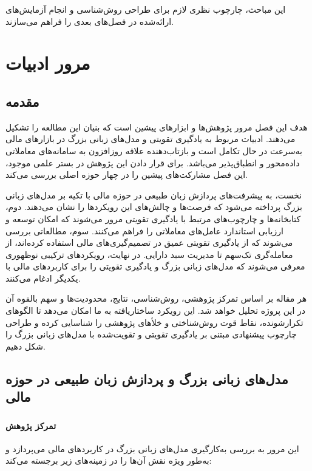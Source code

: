 \documentclass[12pt, a4paper]{report}
\begin{document}
این مباحث، چارچوب نظری لازم برای طراحی روش‌شناسی و انجام آزمایش‌های ارائه‌شده در فصل‌های بعدی را فراهم می‌سازند.


\chapter{مرور ادبیات}

\section{مقدمه}

هدف این فصل مرور پژوهش‌ها و ابزارهای پیشین است که بنیان این مطالعه را تشکیل می‌دهند. ادبیات مربوط به یادگیری تقویتی و مدل‌های زبانی بزرگ در بازارهای مالی به‌سرعت در حال تکامل است و بازتاب‌دهنده علاقه روزافزون به سامانه‌های معاملاتی داده‌محور و انطباق‌پذیر می‌باشد. برای قرار دادن این پژوهش در بستر علمی موجود، این فصل مشارکت‌های پیشین را در چهار حوزه اصلی بررسی می‌کند.  

نخست، به پیشرفت‌های پردازش زبان طبیعی در حوزه مالی با تکیه بر مدل‌های زبانی بزرگ پرداخته می‌شود که فرصت‌ها و چالش‌های این رویکردها را نشان می‌دهند. دوم، کتابخانه‌ها و چارچوب‌های مرتبط با یادگیری تقویتی مرور می‌شوند که امکان توسعه و ارزیابی استاندارد عامل‌های معاملاتی را فراهم می‌کنند. سوم، مطالعاتی بررسی می‌شوند که از یادگیری تقویتی عمیق در تصمیم‌گیری‌های مالی استفاده کرده‌اند، از معامله‌گری تک‌سهم تا مدیریت سبد دارایی. در نهایت، رویکردهای ترکیبی نوظهوری معرفی می‌شوند که مدل‌های زبانی بزرگ و یادگیری تقویتی را برای کاربردهای مالی با یکدیگر ادغام می‌کنند.

هر مقاله بر اساس تمرکز پژوهشی، روش‌شناسی، نتایج، محدودیت‌ها و سهم بالقوه آن در این پروژه تحلیل خواهد شد. این رویکرد ساختاریافته به ما امکان می‌دهد تا الگوهای تکرارشونده، نقاط قوت روش‌شناختی و خلأهای پژوهشی را شناسایی کرده و طراحی چارچوب پیشنهادی مبتنی بر یادگیری تقویتی و تقویت‌شده با مدل‌های زبانی بزرگ را شکل دهیم.  


\section{مدل‌های زبانی بزرگ و پردازش زبان طبیعی در حوزه مالی}

\subsection{ \cite{nie2024survey}}

\subsubsection{تمرکز پژوهش}
این مرور به بررسی به‌کارگیری مدل‌های زبانی بزرگ در کاربردهای مالی می‌پردازد و به‌طور ویژه نقش آن‌ها را در زمینه‌های زیر برجسته می‌کند:
\end{document}
